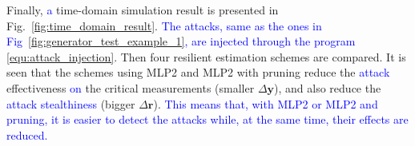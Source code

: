 Finally, \textcolor{blue}{a} time-domain simulation result is presented in Fig.~\ref{fig:time_domain_result}. \textcolor{blue}{The attacks, same as the ones in Fig~\ref{fig:generator_test_example_1}, are injected through the program \eqref{equ:attack_injection}}. Then four resilient estimation schemes are compared. It is seen that the schemes using MLP2 and MLP2 with pruning reduce the \textcolor{blue}{attack} effectiveness \textcolor{blue}{on} the critical measurements (smaller $\Delta \mathbf{y}$), and also reduce the \textcolor{blue}{attack stealthiness} (bigger $\Delta \mathbf{r}$). \textcolor{blue}{This means that, with MLP2 or MLP2 and pruning, it is easier to detect the attacks while, at the same time, their effects are reduced.}

